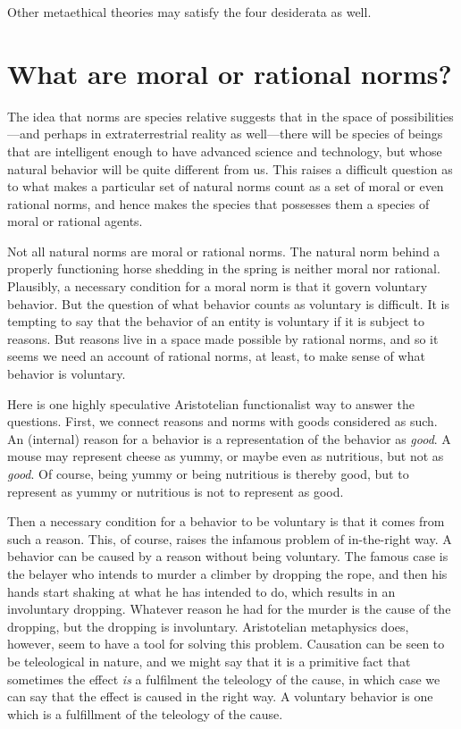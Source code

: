 Other metaethical theories may satisfy the four desiderata as well.

\section{What are moral or rational norms?}
The idea that norms are species relative suggests that in the space of possibilities---and perhaps in extraterrestrial reality
as well---there will be species of beings that are intelligent enough to have advanced science and technology, but whose natural
behavior will be quite different from us. This raises a difficult question as to what makes a particular set of
natural norms count as a set of moral or even rational norms, and hence makes the species that possesses them a species of moral 
or rational agents.

Not all natural norms are moral or rational norms. The natural norm behind a properly functioning horse shedding in the spring
is neither moral nor rational. Plausibly, a necessary condition for a moral norm is that it govern voluntary behavior.
But the question of what behavior counts as voluntary is difficult. It is tempting to say that the behavior of an entity is
voluntary if it is subject to reasons. But reasons live in a space made possible by rational norms, and so it seems we need
an account of rational norms, at least, to make sense of what behavior is voluntary.

Here is one highly speculative Aristotelian functionalist way to answer the questions. First, we connect reasons and norms with goods
considered as such. An (internal) reason 
for a behavior is a representation of the behavior as \textit{good}. A mouse may represent cheese as yummy, or maybe even as nutritious, 
but not as \textit{good}. Of course, being yummy or being nutritious is thereby good, but to represent as yummy or nutritious is not 
to represent as good. 

Then a necessary condition for a behavior to be voluntary is that it 
comes from such a reason. This, of course, raises the infamous problem of in-the-right way. A behavior can be caused by a reason
without being voluntary. The famous case is the belayer who intends to murder a climber by dropping the rope, and then
his hands start shaking at what he has intended to do, which results in an involuntary dropping. Whatever reason he had
for the murder is the cause of the dropping, but the dropping is involuntary. Aristotelian metaphysics does, however, seem
to have a tool for solving this problem. Causation can be seen to be teleological in nature, and we might say that it is 
a primitive fact that sometimes the effect \textit{is} a fulfilment the teleology of the cause, in which case we can say that the effect 
is caused in the right way. A voluntary behavior is one which is a fulfillment of the teleology of the cause.

